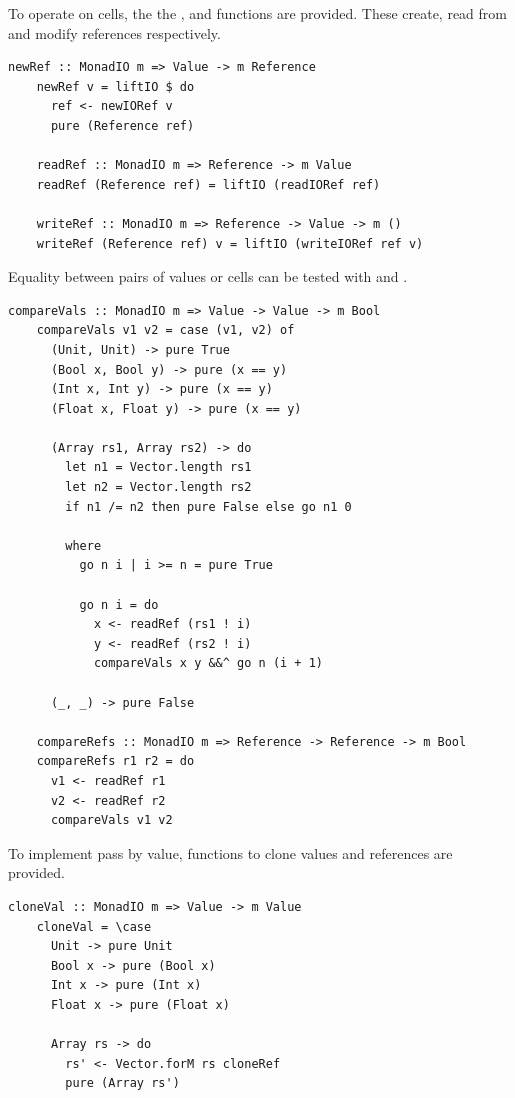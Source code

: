 \documentclass[UdineBachThesis,american,11pt]{PhdThesis}
\begin{document}
  To operate on cells, the the \lstinline@newRef@, \lstinline@readRef@ and
  \lstinline@writeRef@ functions are provided. These create, read from and
  modify references respectively.

  \pagebreak

  \begin{lstlisting}[gobble=4,basicstyle=\ttfamily\small]
    newRef :: MonadIO m => Value -> m Reference
    newRef v = liftIO $ do
      ref <- newIORef v
      pure (Reference ref)

    readRef :: MonadIO m => Reference -> m Value
    readRef (Reference ref) = liftIO (readIORef ref)

    writeRef :: MonadIO m => Reference -> Value -> m ()
    writeRef (Reference ref) v = liftIO (writeIORef ref v)
  \end{lstlisting}

  Equality between pairs of values or cells can be tested with
  \lstinline@compareVals@ and \lstinline@compareRefs@.

  \begin{lstlisting}[gobble=4,basicstyle=\ttfamily\small]
    compareVals :: MonadIO m => Value -> Value -> m Bool
    compareVals v1 v2 = case (v1, v2) of
      (Unit, Unit) -> pure True
      (Bool x, Bool y) -> pure (x == y)
      (Int x, Int y) -> pure (x == y)
      (Float x, Float y) -> pure (x == y)

      (Array rs1, Array rs2) -> do
        let n1 = Vector.length rs1
        let n2 = Vector.length rs2
        if n1 /= n2 then pure False else go n1 0

        where
          go n i | i >= n = pure True

          go n i = do
            x <- readRef (rs1 ! i)
            y <- readRef (rs2 ! i)
            compareVals x y &&^ go n (i + 1)

      (_, _) -> pure False

    compareRefs :: MonadIO m => Reference -> Reference -> m Bool
    compareRefs r1 r2 = do
      v1 <- readRef r1
      v2 <- readRef r2
      compareVals v1 v2
  \end{lstlisting}

  To implement pass by value, functions to clone values and references are
  provided.

  \begin{lstlisting}[gobble=4,basicstyle=\ttfamily\small]
    cloneVal :: MonadIO m => Value -> m Value
    cloneVal = \case
      Unit -> pure Unit
      Bool x -> pure (Bool x)
      Int x -> pure (Int x)
      Float x -> pure (Float x)

      Array rs -> do
        rs' <- Vector.forM rs cloneRef
        pure (Array rs')
  \end{lstlisting}
\end{document}
